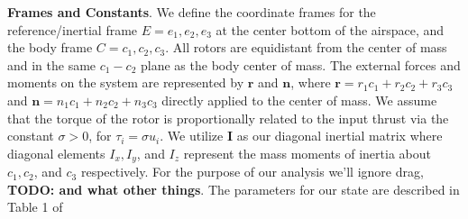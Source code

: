\documentclass{article}
\begin{document}
\begin{multicols}{2}
\noindent \textbf{Frames and Constants}. We define the coordinate frames for the reference/inertial frame $E={e_1, e_2, e_3}$ at the center bottom of the airspace, and the body frame $C={c_1, c_2, c_3}$.  All rotors are equidistant from the center of mass and in the same $c_1-c_2 $ plane as the body center of mass. The external forces and moments on the system are represented by $\boldsymbol{r}$ and $\boldsymbol{n}$, where $\boldsymbol{r} = r_1 c_1 + r_2 c_2 + r_3 c_3$ and $\boldsymbol{n} = n_1 c_1 + n_2 c_2 + n_3 c_3$ directly applied to the center of mass. We assume that the torque of the rotor is proportionally related to the input thrust via the constant $\sigma>0$, for $\tau_i = \sigma u_i$. We utilize $\boldsymbol{I}$ as our diagonal inertial matrix where diagonal elements  $I_x, I_y $, and $I_z$ represent the mass moments of inertia about $c_1, c_2 $, and $c_3$ respectively.  For the purpose of our analysis we'll ignore drag, \textbf{TODO: and what other things}. The parameters for our state are described in Table 1 of \cite{FaalP} %



\end{multicols}
\end{document}
